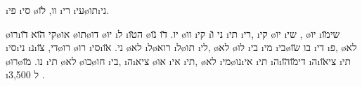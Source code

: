  \i{פי} \i{סי}  \o{וו}, \u{לו}  \i{רי} \i{עי}\o{תו}\i{ני}.

 \o{רו}\i{קי} \u{הוא}  \u{דו}\o{או} \o{תו}\o{דו} \o{יו} \i{ל}  \i{ה}\u{טו} \o{יו}. \u{דו} \u{נו} \o{וו} \i{קי} \i{ני} \u{ו} \i{תי} \i{רי},  \i{קי}  \o{יו}  \i{שי} ,  \o{יו}  \i{שי}\u{מו} \i{סי}\i{ני} \i{נ}\i{די},  \u{צו}\o{רו}   \o{רו} \i{סי}\i{ני}. \u{או}  \o{לא}  \i{ל}\o{רוא} \i{ל}\o{תו} \i{לי}, \o{לא}  \o{לו} \i{בי} \i{מי}  \i{בי}\o{בו} \u{שו} \i{די}  \i{פ},  \o{לא}  \o{רו}\o{נו}.   \u{מו} \i{תי} \o{לא}  \o{כו}\o{חו} \i{בי},  \i{ה}\i{ציא} \o{או} \i{אי}  \i{תי}, \o{לא}  \i{מי}\o{נו}\i{אי}  \i{תי} \i{ה}\i{די}\u{מו}\u{הו} \i{ה}\i{צי}\u{או}  \i{תי}  \i{ל} 3,500 .

